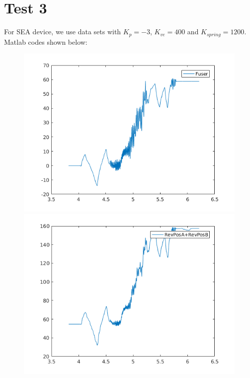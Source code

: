 \documentclass[letterpaper]{article}
\begin{document}
\section*{Test 3}
For SEA device, we use data sets with $K_p=-3$, $K_{ve}=400$ and $K_{spring}=1200$. Matlab codes shown below:

\begin{figure}[H]
	\centering
	\includegraphics[scale=0.5]{sea_fuser.png}\includegraphics[scale=0.5]{sea_revposA_B.png}

\end{figure}
\end{document}
